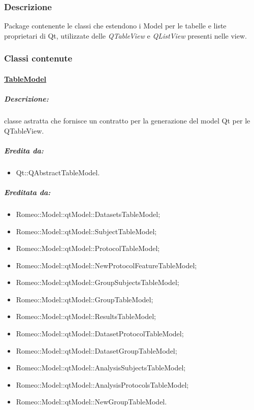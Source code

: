 				\subsubsection{Descrizione}
					\label{qtmodel_desc}
					Package\g{} contenente le classi che estendono i Model per le tabelle e liste proprietari di Qt\g{}, utilizzate delle \textsl{QTableView} e \textsl{QListView} presenti nelle view.
					
				\subsubsection{Classi contenute}
						
					\paragraph{\underline{TableModel}}
					\label{TableModel_class}
						\subparagraph{Descrizione:} classe astratta che fornisce un contratto per la generazione del model Qt\g{} per le QTableView.
						
						\subparagraph{Eredita da:}
							\begin{itemize}
								\item Qt::QAbstractTableModel.		
							\end{itemize}
						
						\subparagraph{Ereditata da:}
							\begin{itemize}
								\item Romeo::Model::qtModel::DatasetsTableModel;
								\item Romeo::Model::qtModel::SubjectTableModel;
								\item Romeo::Model::qtModel::ProtocolTableModel;
								\item Romeo::Model::qtModel::NewProtocolFeatureTableModel;
								\item Romeo::Model::qtModel::GroupSubjectsTableModel;
								\item Romeo::Model::qtModel::GroupTableModel;
								\item Romeo::Model::qtModel::ResultsTableModel;
								\item Romeo::Model::qtModel::DatasetProtocolTableModel;
								\item Romeo::Model::qtModel::DatasetGroupTableModel;
								\item Romeo::Model::qtModel::AnalysisSubjectsTableModel;
								\item Romeo::Model::qtModel::AnalysisProtocolsTableModel;
								\item Romeo::Model::qtModel::NewGroupTableModel.
							\end{itemize}
							
